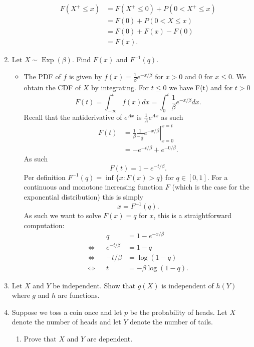 \documentclass{article}
\begin{document}
\begin{enumerate}
\begin{itemize}
			$$
			\begin{aligned}
			F(X^+ \leq x) &= F(X^+ \leq 0) + P(0 < X^+ \leq x) \\
			&= F(0) + P(0 < X \leq x) \\
			&= F(0) + F(x) - F(0) \\
			&= F(x).
			\end{aligned}
			$$
		\end{itemize}
	\item Let $X \sim \operatorname{Exp}(\beta)$. Find $F(x)$ and $F^{-1}(q)$.
		\begin{itemize}
			\item The PDF of $f$ is given by $f(x) = \frac{1}{\beta} e^{- x / \beta}$ for $x > 0$ and $0$ for $x \leq 0$. We obtain the CDF of $X$ by integrating. For $t \leq 0$ we have F(t) and for $t > 0$
			$$
			F(t) = \int_{-\infty}^t f(x) dx = \int_0^t \frac{1}{\beta} e^{-x / \beta} dx.
			$$
			Recall that the antiderivative of $e^{Ax}$ is $\frac{1}{A} e^{Ax}$ as such
			$$
			\begin{aligned}
			F(t) &= \left. \frac{1}{\beta} \frac{1}{-\frac{1}{\beta}} e^{-x / \beta} \right|_{x = 0}^{x = t} \\
			&= - e^{-t / \beta} + e^{-0 / \beta}.
			\end{aligned}
			$$
			As such
			$$
			F(t) = 1 - e^{-t / \beta}.
			$$
			Per definition $F^{-1}(q) = \inf \{x : F(x) > q\}$ for $q \in [0, 1]$. For a continuous and monotone increasing function $F$ (which is the case for the exponential distribution) this is simply
			$$
			x = F^{-1}(q).
			$$
			As such we want to solve $F(x) = q$ for $x$, this is a straightforward computation:
			$$
			\begin{aligned}
			&& q &= 1 - e^{-x / \beta} \\
			\iff&& e^{-t / \beta} &= 1 - q \\
			\iff&& -t/\beta &= \log(1 - q) \\
			\iff&& t &= -\beta \log(1 - q).
			\end{aligned}
			$$
		\end{itemize}
	\item Let $X$ and $Y$ be independent. Show that $g(X)$ is independent of $h(Y)$ where $g$ and $h$ are functions.
	\item Suppose we toss a coin once and let $p$ be the probability of heads. Let $X$ denote the number of heads and let $Y$ denote the number of tails.
		\begin{enumerate}
			\item Prove that $X$ and $Y$ are dependent.

\end{enumerate}
\end{enumerate}
\end{document}
